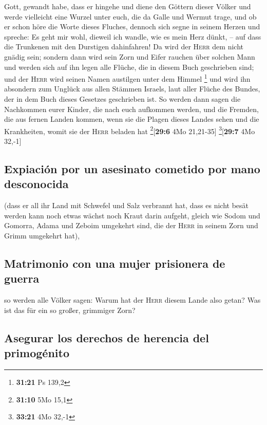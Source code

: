 Gott, gewandt habe, dass er hingehe und diene den Göttern dieser Völker
und werde vielleicht eine Wurzel unter euch, die da Galle und Wermut
trage,  und ob er schon höre die Worte dieses Fluches,
dennoch sich segne in seinem Herzen und spreche: Es geht mir wohl,
dieweil ich wandle, wie es mein Herz dünkt, -- auf dass die Trunkenen
mit den Durstigen dahinfahren!  Da wird der \textsc{Herr}
dem nicht gnädig sein; sondern dann wird sein Zorn und Eifer rauchen
über solchen Mann und werden sich auf ihn legen alle Flüche, die in
diesem Buch geschrieben sind; und der \textsc{Herr} wird seinen Namen
austilgen unter dem Himmel \footnote{\textbf{31:21} Ps 139,2}
 und wird ihn absondern zum Unglück aus allen Stämmen
Israels, laut aller Flüche des Bundes, der in dem Buch dieses Gesetzes
geschrieben ist.  So werden dann sagen die Nachkommen
eurer Kinder, die nach euch aufkommen werden, und die Fremden, die aus
fernen Landen kommen, wenn sie die Plagen dieses Landes sehen und die
Krankheiten, womit sie der \textsc{Herr} beladen hat
\footnote{\textbf{31:10} 5Mo 15,1}{[}\textbf{29:6} 4Mo 21,21-35{]}
\footnote{\textbf{33:21} 4Mo 32,-1}{[}\textbf{29:7} 4Mo 32,-1{]}

\hypertarget{expiaciuxf3n-por-un-asesinato-cometido-por-mano-desconocida}{%
\subsection{Expiación por un asesinato cometido por mano
desconocida}\label{expiaciuxf3n-por-un-asesinato-cometido-por-mano-desconocida}}

 (dass er all ihr Land mit Schwefel und Salz verbrannt
hat, dass es nicht besät werden kann noch etwas wächst noch Kraut darin
aufgeht, gleich wie Sodom und Gomorra, Adama und Zeboim umgekehrt sind,
die der \textsc{Herr} in seinem Zorn und Grimm umgekehrt hat),

\hypertarget{matrimonio-con-una-mujer-prisionera-de-guerra}{%
\subsection{Matrimonio con una mujer prisionera de
guerra}\label{matrimonio-con-una-mujer-prisionera-de-guerra}}

 so werden alle Völker sagen: Warum hat der \textsc{Herr}
diesem Lande also getan? Was ist das für ein so großer, grimmiger Zorn?

\hypertarget{asegurar-los-derechos-de-herencia-del-primoguxe9nito}{%
\subsection{Asegurar los derechos de herencia del
primogénito}\label{asegurar-los-derechos-de-herencia-del-primoguxe9nito}}

